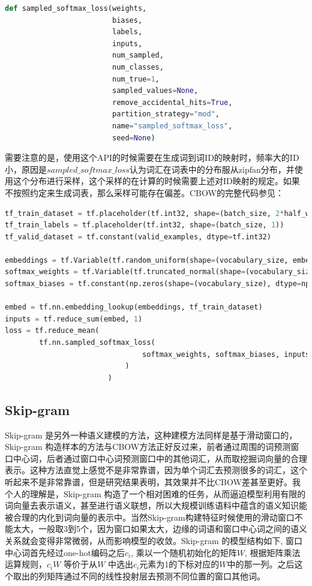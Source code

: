 \documentclass[twoside,a4paper,12pt]{book}%
\begin{document}
\begin{lstlisting}[language={python}] 
def sampled_softmax_loss(weights,
                         biases,
                         labels,
                         inputs,
                         num_sampled,
                         num_classes,
                         num_true=1,
                         sampled_values=None,
                         remove_accidental_hits=True,
                         partition_strategy="mod",
                         name="sampled_softmax_loss",
                         seed=None)  
\end{lstlisting}  



需要注意的是，使用这个API的时候需要在生成词到词ID的映射时，频率大的ID小，原因是$sampled\_softmax\_loss$认为词汇在词表中的分布服从zipfan分布，并使用这个分布进行采样，这个采样的在计算的时候需要上述对ID映射的规定。如果不按照约定来生成词表，那么采样可能存在偏差。\gls{CBOW}的完整代码参见：

\begin{lstlisting}[language={python}]
tf_train_dataset = tf.placeholder(tf.int32, shape=(batch_size, 2*half_window_size))
tf_train_labels = tf.placeholder(tf.int32, shape=(batch_size, 1))
tf_valid_dataset = tf.constant(valid_examples, dtype=tf.int32)

embeddings = tf.Variable(tf.random_uniform(shape=(vocabulary_size, embedding_size), minval=-1.0, maxval=1.0))
softmax_weights = tf.Variable(tf.truncated_normal(shape=(vocabulary_size, embedding_size), stddev=1.0 / math.sqrt(embedding_size)))
softmax_biases = tf.constant(np.zeros(shape=(vocabulary_size), dtype=np.float32))

embed = tf.nn.embedding_lookup(embeddings, tf_train_dataset)
inputs = tf.reduce_sum(embed, 1)
loss = tf.reduce_mean(
		tf.nn.sampled_softmax_loss(
								softmax_weights, softmax_biases, inputs, tf_train_labels, num_sampled, vocabulary_size
							)
						)
\end{lstlisting}


\subsection{Skip-gram}
Skip-gram 是另外一种语义建模的方法，这种建模方法同样是基于滑动窗口的，Skip-gram 构造样本的方法与\gls{CBOW}方法正好反过来，前者通过周围的词预测窗口中心词，后者通过窗口中心词预测窗口中的其他词汇，从而取挖掘词向量的合理表示。这种方法直觉上感觉不是非常靠谱，因为单个词汇去预测很多的词汇，这个听起来不是非常靠谱，但是研究结果表明，其效果并不比\gls{CBOW}差甚至更好。我个人的理解是，Skip-gram 构造了一个相对困难的任务，从而逼迫模型利用有限的词向量去表示语义，甚至进行语义联想，所以大规模训练语料中蕴含的语义知识能被合理的内化到词向量的表示中。当然Skip-gram构建特征时候使用的滑动窗口不能太大，一般取3到5个，因为窗口如果太大，边缘的词语和窗口中心词之间的语义关系就会变得非常微弱，从而影响模型的收敛。Skip-gram 的模型结构如下, 窗口中心词首先经过one-hot编码之后$c_i$, 乘以一个随机初始化的矩阵$W$, 根据矩阵乘法运算规则，$c_iW$ 等价于从$W$ 中选出$c_i$元素为1的下标对应的$W$中的那一列。之后这个取出的列矩阵通过不同的线性投射层去预测不同位置的窗口其他词。
\end{document}
